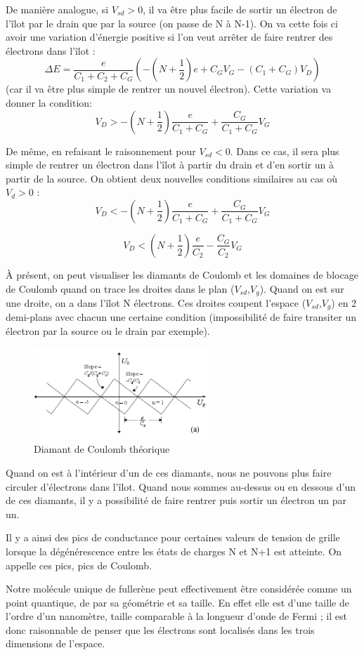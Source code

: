 De manière analogue, si $V_{sd}>0$, il va être plus facile de sortir un électron de l'îlot par le drain que par la source (on passe de N à N-1). On va cette fois ci avoir une variation d'énergie positive si l'on veut arrêter de faire rentrer des électrons dans l'îlot :
\[\Delta E = \frac{e}{C_1 + C_2 + C_G}\left(-(N + \frac{1}{2})e + C_G V_G - (C_1 + C_G) V_D\right)\]
(car il va être plus simple de rentrer un nouvel électron). Cette variation va donner la condition:
\[V_D > - (N + \frac{1}{2})\frac{e}{C_1 + C_G} + \frac{C_G}{C_1 + C_G}V_G\]

De même, en refaisant le raisonnement pour $V_{sd}<0$. Dans ce cas, il sera plus simple de rentrer un électron dans l'îlot à partir du drain et d'en sortir un à partir de la source. On obtient deux nouvelles conditions similaires au cas où  $V_{d}>0$ :
\[V_D < - (N + \frac{1}{2})\frac{e}{C_1 + C_G} + \frac{C_G}{C_1 + C_G}V_G\]

\[V_D < (N + \frac{1}{2})\frac{e}{C_2} - \frac{C_G}{C_2}V_G\]

À présent, on peut visualiser les diamants de Coulomb et les domaines de blocage de Coulomb quand on trace les droites dans le plan ($V_{sd}$,$V_{g}$). Quand on est sur une droite, on a dans l'îlot N électrons. Ces droites coupent l'espace ($V_{sd}$,$V_{g}$) en 2 demi-plans avec chacun une certaine condition (impossibilité de faire transiter un électron par la source ou le drain par exemple).
\begin{figure}[h]
    \begin{center}
        \includegraphics[width=250px]{Images/2_Diamant_Coulomb_Theorie.png}
        \caption{Diamant de Coulomb théorique}
    \end{center}
\end{figure}

Quand on est à l'intérieur d'un de ces diamants, nous ne pouvons plus faire circuler d'électrons dans l'îlot. Quand nous sommes au-dessus ou en dessous d'un de ces diamants, il y a possibilité de faire rentrer puis sortir un électron un par un.

Il y a ainsi des pics de conductance pour certaines valeurs de tension de grille lorsque la dégénérescence entre les états de charges N et N+1 est atteinte. On appelle ces pics, pics de Coulomb.

Notre molécule unique de fullerène peut effectivement être considérée comme un point quantique, de par sa géométrie et sa taille. En effet elle est d'une taille de l'ordre d'un nanomètre, taille comparable à la longueur d'onde de Fermi ; il est donc raisonnable de penser que les électrons sont localisés dans les trois dimensions de l'espace.
